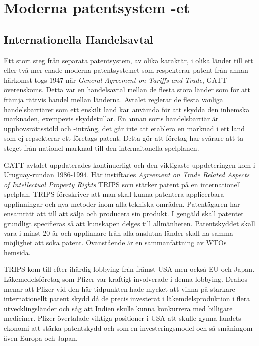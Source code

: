 \section{Moderna patentsystem -et}
\label{sec:modern}

\subsection{Internationella Handelsavtal}
Ett stort steg från separata patentsystem, av olika karaktär, i olika länder till ett eller två mer enade moderna patentsystemet som respekterar patent från annan härkomst togs 1947 när \emph{General Agreement on Tariffs and Trade}, GATT överenskoms. Detta var en handelsavtal mellan de flesta stora länder som för att främja rättvis handel mellan länderna. \cite{gatt} Avtalet reglerar de flesta vanliga handelsbarriärer som ett enskilt land kan anvämda för att skydda den inhemska marknaden, exempevis skyddstullar. En annan sorts handelsbarriär är upphovsrättsstöld och -intrång, det går inte att etablera en marknad i ett land som ej repsekterar ett företags patent. Detta gör att företag har svårare att ta steget från nationel marknad till den internaitonella spelplanen.

GATT avtalet uppdaterades kontinuerligt och den viktigaste uppdeteringen kom i Uruguay-rundan 1986-1994. Här instiftades \emph{Agreement on Trade Related Aspects of Intellectual Property Rights} TRIPS som stärker patent på en internationell spelplan. TRIPS föreskriver att man skall kunna patentera applicerbara uppfinningar och nya metoder inom alla tekniska områden. Patentägaren har ensamrätt att till att sälja och producera sin produkt. I gengäld skall patentet grundligt specifieras så att kunskapen delges till allmänheten. Patentskyddet skall vara  i minst 20 år och uppfinnare från alla anslutna länder skall ha samma möjlighet att söka patent. Ovanstående är en sammanfattning av WTOs hemsida\cite{wto}.

TRIPS kom till efter ihärdig lobbying från främst USA men också EU och Japan\cite{drahos}. Läkemedelsföretag som Pfizer var kraftigt involverade i denna lobbying\cite{drahos}. Drahos menar att Pfizer vid den här tidpunkten hade mycket att vinna på starkare internationellt patent skydd då de precis investerat i läkemdelsproduktion i flera utvecklingsländer och såg att Indien skulle kunna konkurrera med billigare mediciner\cite{drahos}. Pfizer övertalade viktiga positioner i USA att skulle gynna landets ekonomi att stärka patentskydd och \cite{Intelectual Property} som en investeringsmodel och så småningom även Europa och Japan\cite{drahos}.

